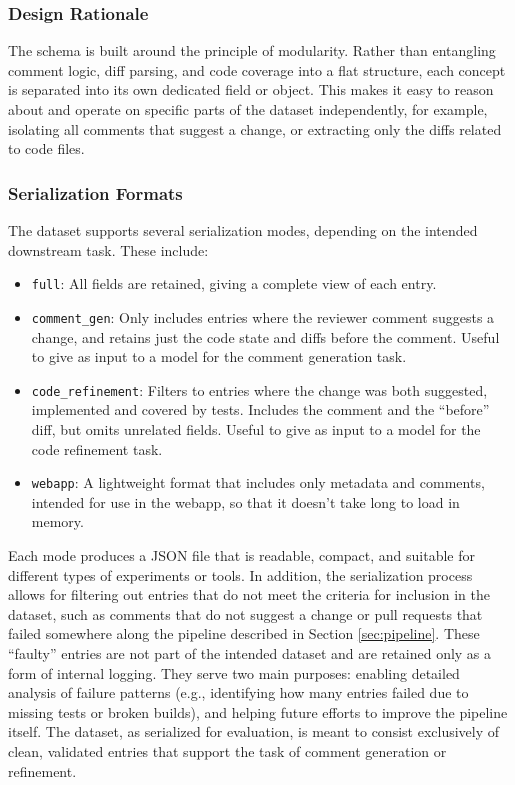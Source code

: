 \subsubsection{Design Rationale}

The schema is built around the principle of modularity. Rather than entangling comment logic, diff
parsing, and code coverage into a flat structure, each concept is separated into its own dedicated
field or object. This makes it easy to reason about and operate on specific parts of the dataset
independently, for example, isolating all comments that suggest a change, or extracting only the
diffs related to code files.

\subsubsection{Serialization Formats}

The dataset supports several serialization modes, depending on the intended downstream task. These
include:
\begin{itemize}
	\item \texttt{full}: All fields are retained, giving a complete view of each entry.
	\item \texttt{comment\_gen}: Only includes entries where the reviewer comment suggests a change,
	      and retains just the code state and diffs before the comment. Useful to give as input to
	      a model for the comment generation task.
	\item \texttt{code\_refinement}: Filters to entries where the change was both suggested,
	      implemented and covered by tests. Includes the comment and the ``before'' diff, but omits
	      unrelated fields. Useful to give as input to a model for the code refinement task.
	\item \texttt{webapp}: A lightweight format that includes only metadata and comments, intended
	      for use in the webapp, so that it doesn't take long to load in memory.
\end{itemize}

Each mode produces a JSON file that is readable, compact, and suitable for different types of
experiments or tools. In addition, the serialization process allows for filtering out entries that
do not meet the criteria for inclusion in the dataset, such as comments that do not suggest a change
or pull requests that failed somewhere along the pipeline described in Section \ref{sec:pipeline}.
These “faulty” entries are not part of the intended dataset and are retained only as a form of
internal logging. They serve two main purposes: enabling detailed analysis of failure patterns
(e.g., identifying how many entries failed due to missing tests or broken builds), and helping
future efforts to improve the pipeline itself. The dataset, as serialized for
evaluation, is meant to consist exclusively of clean, validated entries that support the task of
comment generation or refinement.


